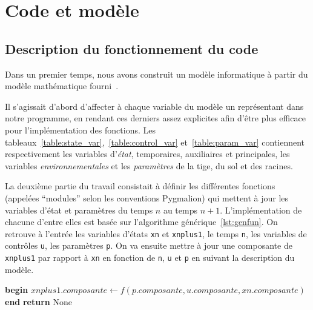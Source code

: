 \section{Code et modèle}

\newpage
\subsection{Description du fonctionnement du code}
Dans un premier temps, nous avons construit un modèle informatique à partir
du modèle mathématique fourni~\cite{lnas_model_wheat}.

Il s'agissait d'abord d'affecter à chaque variable du modèle un représentant
dans notre programme, en rendant ces derniers assez explicites
afin d'être plus efficace pour l'implémentation des fonctions.
Les tableaux~\ref{table:state_var},~\ref{table:control_var} et~\ref{table:param_var}
contiennent respectivement les variables d'\emph{état}, temporaires, auxiliaires et principales, 
les variables \emph{environnementales} et les \emph{paramètres} de la tige, du sol et des racines.

La deuxième partie du travail consistait à définir les différentes fonctions (appelées ``modules'' selon les conventions Pygmalion)
qui mettent à jour les variables d'état et paramètres du 
temps $n$ au temps $n+1$.
L'implémentation de chacune d'entre elles est basée sur l'algorithme générique~\ref{lst:genfun}.
On retrouve à l'entrée les variables d'états \texttt{xn} et \texttt{xnplus1},
le temps \texttt{n}, les variables de contrôles \texttt{u}, les paramètres \texttt{p}.
On va ensuite mettre à jour une composante de \lstinline|xnplus1| par rapport à \texttt{xn} en fonction de \texttt{n}, \texttt{u} et \texttt{p} en suivant la description du modèle.

\begin{algorithm}[h]
  \caption{Algorithme générique qui sert de base pour l'implémentation
des fonctions. La fonction $f$ n'est pas définie mais sert de placeholder
pour représenter les opérations nécessaires à la mise à jour de \lstinline|xnplus1|.}
\label{lst:genfun}
  \begin{algorithmic}[1]
    \State \textbf{begin}
      \State $xnplus1.composante \gets f(p.composante, u.composante, xn.composante)$
    \State \textbf{end}
    \State \textbf{return} None
    \EndProcedure
  \end{algorithmic}
\end{algorithm}

